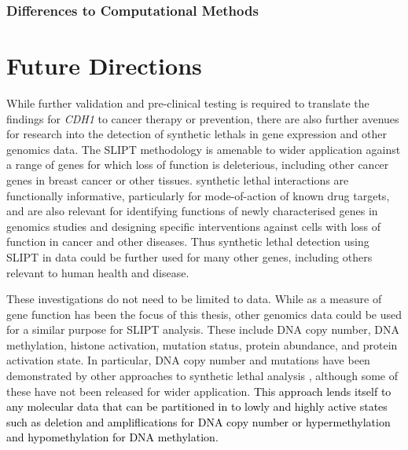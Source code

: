 \subsubsection{Differences to Computational Methods}
\label{chapt6:slipt_compare_computational}
\fi

\section{Future Directions}
\label{chapt6:future}

While further validation and pre-clinical testing is required to translate the findings for \textit{CDH1} to cancer therapy or prevention, there are also further avenues for research into the detection of \glspl{synthetic lethal} in \gls{gene expression} and other \glspl{genomic} data. The \gls{SLIPT} methodology is amenable to wider application against a range of genes for which loss of function is deleterious, including other cancer genes in breast cancer or other tissues. \Gls{synthetic lethal} interactions are functionally informative, particularly for mode-of-action of known drug targets, and are also relevant for identifying functions of newly characterised genes in \glspl{genomic} studies and designing specific interventions against cells with loss of function in cancer and other diseases. Thus \gls{synthetic lethal} detection using \gls{SLIPT} in  data could be further used for many other genes, including others relevant to human health and disease.

These investigations do not need to be limited to  data. While  as a measure of gene function has been the focus of this thesis, other \glspl{genomic} data could be used for a similar purpose for \gls{SLIPT} analysis. These include \acrshort{DNA} copy number, \acrshort{DNA} methylation, histone activation, \gls{mutation} status, protein abundance, and protein activation state. In particular, \acrshort{DNA} copy number and \glspl{mutation} have been demonstrated by other approaches to \gls{synthetic lethal} analysis \citep{Jerby2014, Srihari2015, Lu2015, Wappett2016}, although some of these have not been released for wider application. \textcolor{black}{This approach lends itself to any molecular data that can be partitioned in to lowly and highly active states such as deletion and ampliflications for DNA copy number or hypermethylation and hypomethylation for DNA methylation.}


